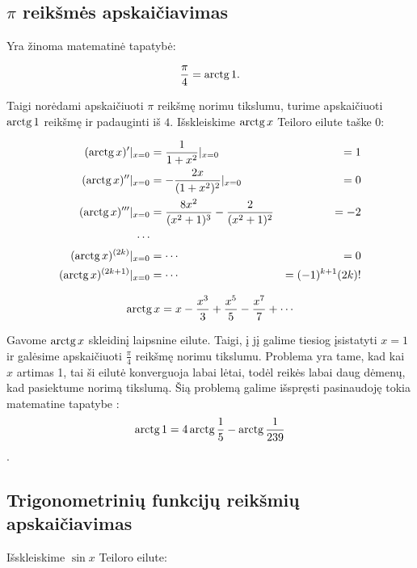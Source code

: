 \subsection{$\pi$ reikšmės apskaičiavimas}

Yra žinoma matematinė tapatybė:

\begin{equation}
  \frac{\pi}{4} = \mathop{\text{arctg}} 1.
  \label{pi_1}
\end{equation}

Taigi norėdami apskaičiuoti $\pi$ reikšmę norimu tikslumu, turime 
apskaičiuoti $\mathop{\text{arctg}} 1$ reikšmę ir padauginti iš $4$. Išskleiskime
$\mathop{\text{arctg}} x$ Teiloro eilute taške $0$:

\begin{align*}
  (\arctg x)'|_{x=0} &= \frac{1}{1 + x^2}|_{x=0} &= 1 \\
  (\arctg x)''|_{x=0} &= -\frac{2 x}{(1 + x^2)^2}|_{x=0} &= 0 \\
  (\arctg x)'''|_{x=0} &=%
    \frac{8 x^2}{(x^2 + 1)^3} - \frac{2}{(x^2 + 1)^2} &= -2 \\
  \cdots\\
  (\arctg x)^{(2k)}|_{x=0} &= \cdots &= 0 \\
  (\arctg x)^{(2k+1)}|_{x=0} &= \cdots &= (-1)^{k+1}(2k)! 
\end{align*}

\begin{equation}
  \arctg x = x - \frac{x^3}{3} + \frac{x^5}{5} - \frac{x^7}{7}%
    + \cdots
  \label{pi_2}
\end{equation}

Gavome $\mathop{\text{arctg}} x$ skleidinį laipsnine eilute. Taigi, į jį galime 
tiesiog įsistatyti $x = 1$ ir galėsime apskaičiuoti $\frac{\pi}{4}$ reikšmę
norimu tikslumu. Problema yra tame, kad kai $x$ artimas 1, tai ši
eilutė konverguoja labai lėtai, todėl reikės labai daug dėmenų, kad
pasiektume norimą tikslumą. Šią problemą galime išspręsti pasinaudoję
tokia matematine tapatybe \cite{fractal_pi}: %
\begin{equation}
  \mathop{\text{arctg}} 1 = 4 \mathop{\text{arctg}} \frac{1}{5} - \mathop{\text{arctg}} \frac{1}{239}
  \label{pi_3}
\end{equation}.

\subsection{Trigonometrinių funkcijų reikšmių apskaičiavimas}

Išskleiskime $\sin x$ Teiloro eilute:

